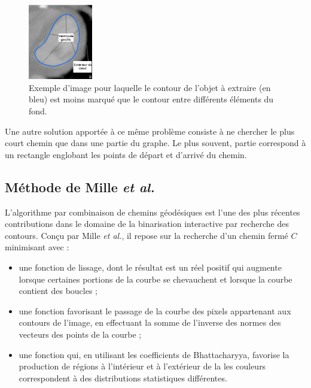 \begin{figure}[htb]
	\centering
			\includegraphics[width=0.25\textwidth]{images/etat-de-l-art/CI_avec_app_ex}
		 \caption{Exemple d'image pour laquelle le contour de l'objet à extraire (en bleu) est moins marqué que le contour entre différents éléments du fond.}
		 \label{fig:sota_CI_avec_app_ex}
\end{figure}

Une autre solution apportée à ce même problème consiste à ne chercher le plus court chemin que dans une partie du graphe. Le plus souvent,  partie correspond à un rectangle englobant les points de départ et d'arrivé du chemin. 

\subsection{Méthode de Mille \textit{et al.}}

L'algorithme par combinaison de chemins géodésiques \cite{mille2015combination} est l'une des plus récentes contributions dans le domaine de la binarisation interactive par recherche des contours. Conçu par Mille \textit{et al.}, il repose sur la recherche d'un chemin fermé  $C$ minimisant
avec :
\begin{itemize}
\item {} une fonction de lissage, dont le résultat est un réel positif qui augmente lorsque certaines portions de la courbe se chevauchent et lorsque la courbe contient des boucles ;
\item {} une fonction favorisant le passage de la courbe  des pixels appartenant aux contours de l'image, en effectuant la somme de l'inverse des normes des vecteurs  des points de la courbe  ;
\item {} une fonction qui, en utilisant les coefficients de Bhattacharyya, favorise la production de régions à l'intérieur et à l'extérieur de la  les couleurs correspondent à des distributions statistiques différentes.
\end{itemize} 

